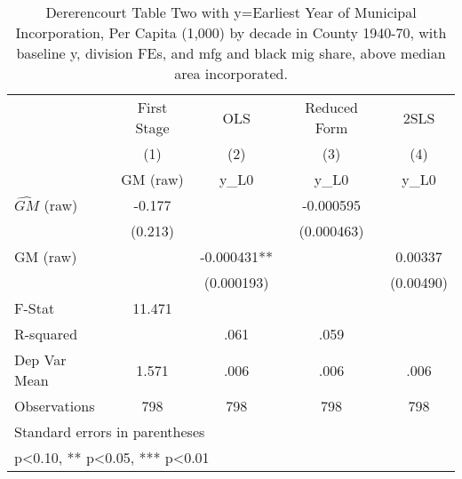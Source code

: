 \begin{table}[htbp]\centering
\def\sym#1{\ifmmode^{#1}\else\(^{#1}\)\fi}
\caption{Dererencourt Table Two with y=Earliest Year of Municipal Incorporation, Per Capita (1,000) by decade in County 1940-70, with baseline y, division FEs, and mfg and black mig share, above median area incorporated.}
\begin{tabular}{l*{4}{c}}
\toprule
                    & First Stage   &         OLS   &Reduced Form   &        2SLS   \\
                    &\multicolumn{1}{c}{(1)}&\multicolumn{1}{c}{(2)}&\multicolumn{1}{c}{(3)}&\multicolumn{1}{c}{(4)}\\
                    &\multicolumn{1}{c}{GM  (raw)}&\multicolumn{1}{c}{y\_L0}&\multicolumn{1}{c}{y\_L0}&\multicolumn{1}{c}{y\_L0}\\
\midrule
$\hat{GM}$ (raw)    &      -0.177   &               &   -0.000595   &               \\
                    &     (0.213)   &               &  (0.000463)   &               \\
\addlinespace
GM  (raw)           &               &   -0.000431** &               &     0.00337   \\
                    &               &  (0.000193)   &               &   (0.00490)   \\
\midrule
F-Stat              &      11.471   &               &               &               \\
R-squared           &               &        .061   &        .059   &               \\
Dep Var Mean        &       1.571   &        .006   &        .006   &        .006   \\
Observations        &         798   &         798   &         798   &         798   \\
\bottomrule
\multicolumn{5}{l}{\footnotesize Standard errors in parentheses}\\
\multicolumn{5}{l}{\footnotesize * p<0.10, ** p<0.05, *** p<0.01}\\
\end{tabular}
\end{table}
